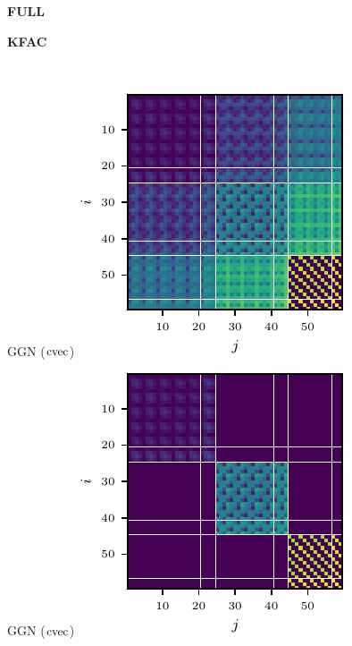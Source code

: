 \begin{figure}[t!]
  \centering
  \begin{minipage}[t]{0.485\linewidth}
    \centering
    \textbf{FULL}
  \end{minipage}
  \hfill
  \begin{minipage}[t]{0.485\linewidth}
    \centering
    \textbf{KFAC}
  \end{minipage}
  \\
  \begin{minipage}[t]{0.485\linewidth}
    \centering
     GGN ($\operatorname{cvec}$)\vspace{1ex}
    \includegraphics[width=0.8\linewidth]{../kfs/plots/synthetic_cvec_ggn_full.pdf}
  \end{minipage}
  \hfill
  \begin{minipage}[t]{0.485\linewidth}
    \centering
    GGN ($\operatorname{cvec}$)\vspace{1ex}
    \includegraphics[width=0.8\linewidth]{../kfs/plots/synthetic_cvec_ggn_kfac.pdf}

\end{minipage}
\end{figure}
